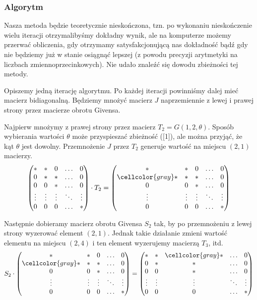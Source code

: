 \documentclass{article}
\theoremstyle{definition}
\newcommand{\szary}{\cellcolor{gray}}
\begin{document}
\subsubsection{Algorytm}
Nasza metoda będzie teoretycznie nieskończona, tzn. po wykonaniu nieskończenie wielu iteracji otrzymalibyśmy dokładny wynik, ale na komputerze możemy przerwać obliczenia, gdy otrzymamy satysfakcjonującą nas dokładność bądź gdy nie będziemy już w stanie osiągnąć lepszej (z powodu precyzji arytmetyki na liczbach zmiennoprzecinkowych). Nie udało znaleźć się dowodu zbieżności tej metody.

Opiszemy jedną iterację algorytmu. Po każdej iteracji powinniśmy dalej mieć macierz bidiagonalną. Będziemy mnożyć macierz $J$ naprzemiennie z lewej i prawej strony przez macierze obrotu Givensa. 

Najpierw mnożymy z prawej strony przez macierz $T_2 = G(1,2, \theta)$. Sposób wybierania wartości $\theta$ może przyspieszać zbieżność ([1]), ale można przyjąć, że kąt $\theta$ jest dowolny.  Przemnożenie $J$ przez $T_2$ generuje wartość na miejscu $(2,1)$ macierzy.
$$ \begin{pmatrix}
\ast & \ast & 0 & \ldots & 0 \\
0 & \ast & \ast & \ldots & 0 \\
0 & 0 & \ast & \ldots & 0 \\
\vdots & \vdots & \vdots & \ddots & \vdots \\
0 & 0 & 0 & \ldots & \ast 
\end{pmatrix} \cdot T_2 = \begin{pmatrix}
\ast & \ast & 0 & \ldots & 0 \\
\szary \ast & \ast & \ast & \ldots & 0 \\
0 & 0 & \ast & \ldots & 0 \\
\vdots & \vdots & \vdots & \ddots & \vdots \\
0 & 0 & 0 & \ldots & \ast 
\end{pmatrix} $$

Następnie dobieramy macierz obrotu Givensa $S_2$ tak, by po przemnożeniu z lewej strony wyzerować element $(2,1)$. Jednak takie działanie zmieni wartość elementu na miejscu $(2, 4)$ i ten element wyzerujemy macierzą $T_3$, itd.
$$ S_2 \cdot \begin{pmatrix}
\ast & \ast & 0 & \ldots & 0 \\
\szary \ast & \ast & \ast & \ldots & 0 \\
0 & 0 & \ast & \ldots & 0 \\
\vdots & \vdots & \vdots & \ddots & \vdots \\
0 & 0 & 0 & \ldots & \ast 
\end{pmatrix} =
\begin{pmatrix}
\ast & \ast & \szary \ast & \ldots & 0 \\
0 & \ast & \ast & \ldots & 0 \\
0 & 0 & \ast & \ldots & 0 \\
\vdots & \vdots & \vdots & \ddots & \vdots \\
0 & 0 & 0 & \ldots & \ast 
\end{pmatrix}$$
\end{document}
